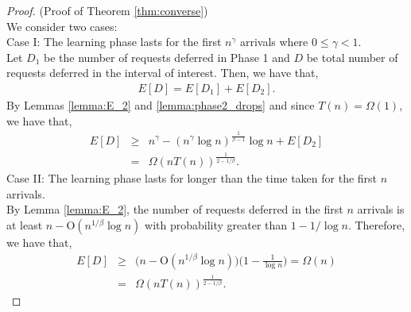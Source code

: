 \documentclass[10pt, conference, letterpaper]{IEEEtran}
\def \OO {\mathrm{O}}
\begin{document}
\begin{proof} (Proof of Theorem \ref{thm:converse}) \\
	We consider two cases: \\
	Case I: The learning phase lasts for the first $n^\gamma$ arrivals where $0 \leq \gamma < 1$. \\
	Let $D_1$ be the number of requests deferred in Phase 1 and $D$ be total number of requests deferred in the interval of interest. Then, we have that,
	\begin{eqnarray*}
		E[D] = E[D_1] + E[D_2].
	\end{eqnarray*}
	By Lemmas \ref{lemma:E_2} and \ref{lemma:phase2_drops} and since $T(n) = \Omega(1)$, we have that,
	\begin{eqnarray*}
		E[D] &\geq& n^\gamma - ({n^{\gamma}\log n})^{\frac{1}{\beta-1}}\log n + E[D_2] \\
		&=& \Omega(nT(n))^{\frac{1}{2-1/\beta}}.
	\end{eqnarray*}
	Case II: The learning phase lasts for longer than the time taken for the first $n$ arrivals.\\
	By Lemma \ref{lemma:E_2}, the number of requests deferred in the first $n$ arrivals is at least $n - \OO(n^{1/\beta}\log n)$ with probability greater than $ 1-1/\log n$. Therefore, we have that,
	\begin{eqnarray*}
		E[D] &\geq& \bigg(n - \OO(n^{1/\beta}\log n)\bigg) \bigg(1-\frac{1}{\log n}\bigg) = \Omega(n) \\
		&=& \Omega(nT(n))^{\frac{1}{2-1/\beta}}.
	\end{eqnarray*}
\end{proof}
\end{document}
